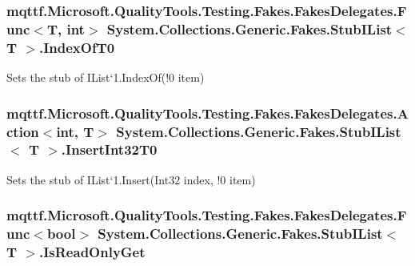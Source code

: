 \hypertarget{class_system_1_1_collections_1_1_generic_1_1_fakes_1_1_stub_i_list_3_01_t_01_4_aaad26e8b56025f5036f278a6828ae911}{
\subsubsection[{Index\-Of\-T0}]{\setlength{\rightskip}{0pt plus 5cm}mqttf.\-Microsoft.\-Quality\-Tools.\-Testing.\-Fakes.\-Fakes\-Delegates.\-Func$<$T, int$>$ System.\-Collections.\-Generic.\-Fakes.\-Stub\-I\-List$<$ T $>$.Index\-Of\-T0}}\label{class_system_1_1_collections_1_1_generic_1_1_fakes_1_1_stub_i_list_3_01_t_01_4_aaad26e8b56025f5036f278a6828ae911}


Sets the stub of I\-List`1.Index\-Of(!0 item)

\hypertarget{class_system_1_1_collections_1_1_generic_1_1_fakes_1_1_stub_i_list_3_01_t_01_4_a52dbddc75092d3d64a0b739c5f9700d9}{
\subsubsection[{Insert\-Int32\-T0}]{\setlength{\rightskip}{0pt plus 5cm}mqttf.\-Microsoft.\-Quality\-Tools.\-Testing.\-Fakes.\-Fakes\-Delegates.\-Action$<$int, T$>$ System.\-Collections.\-Generic.\-Fakes.\-Stub\-I\-List$<$ T $>$.Insert\-Int32\-T0}}\label{class_system_1_1_collections_1_1_generic_1_1_fakes_1_1_stub_i_list_3_01_t_01_4_a52dbddc75092d3d64a0b739c5f9700d9}


Sets the stub of I\-List`1.Insert(Int32 index, !0 item)

\hypertarget{class_system_1_1_collections_1_1_generic_1_1_fakes_1_1_stub_i_list_3_01_t_01_4_a0eb0fdcd5e06c75b6606254df75a637b}{
\subsubsection[{Is\-Read\-Only\-Get}]{\setlength{\rightskip}{0pt plus 5cm}mqttf.\-Microsoft.\-Quality\-Tools.\-Testing.\-Fakes.\-Fakes\-Delegates.\-Func$<$bool$>$ System.\-Collections.\-Generic.\-Fakes.\-Stub\-I\-List$<$ T $>$.Is\-Read\-Only\-Get}}\label{class_system_1_1_collections_1_1_generic_1_1_fakes_1_1_stub_i_list_3_01_t_01_4_a0eb0fdcd5e06c75b6606254df75a637b}


